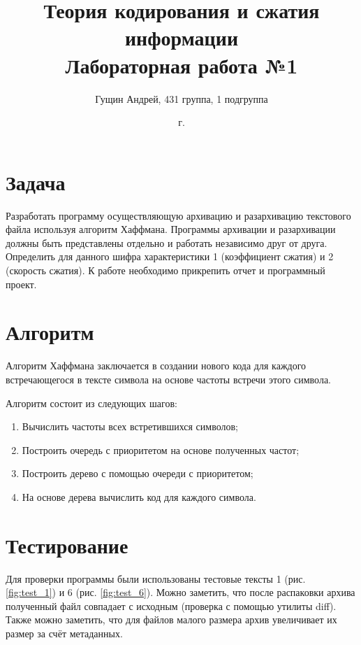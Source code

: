 \documentclass[a4paper,oneside]{article}
\title{{Теория кодирования и сжатия информации}\\{Лабораторная работа №1}}
\author{Гущин Андрей, 431 группа, 1 подгруппа}
\date{\the\year{} г.}
\theoremstyle{definition}
\begin{document}
\maketitle

\section{Задача}

Разработать программу осуществляющую архивацию и разархивацию текстового файла
используя алгоритм Хаффмана. Программы архивации и разархивации должны быть
представлены отдельно и работать независимо друг от друга. Определить для
данного шифра характеристики 1 (коэффициент сжатия) и 2 (скорость сжатия). К
работе необходимо прикрепить отчет и программный проект.


\section{Алгоритм}

Алгоритм Хаффмана заключается в создании нового кода для каждого встречающегося
в тексте символа на основе частоты встречи этого символа.

Алгоритм состоит из следующих шагов:
\begin{enumerate}
  \item Вычислить частоты всех встретившихся символов;
  \item Построить очередь с приоритетом на основе полученных частот;
  \item Построить дерево с помощью очереди с приоритетом;
  \item На основе дерева вычислить код для каждого символа.
\end{enumerate}


\section{Тестирование}

Для проверки программы были использованы тестовые тексты 1 (рис.
\ref{fig:test_1}) и 6 (рис. \ref{fig:test_6}). Можно заметить,
что после распаковки архива полученный файл совпадает с исходным (проверка
с помощью утилиты diff). Также можно заметить, что для файлов малого размера
архив увеличивает их размер за счёт метаданных.
\end{document}
